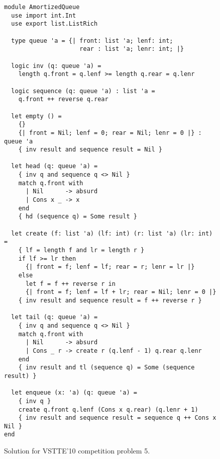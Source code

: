 \begin{figure}
  \centering
\begin{verbatim}
module AmortizedQueue
  use import int.Int
  use export list.ListRich

  type queue 'a = {| front: list 'a; lenf: int;
                     rear : list 'a; lenr: int; |}

  logic inv (q: queue 'a) =
    length q.front = q.lenf >= length q.rear = q.lenr

  logic sequence (q: queue 'a) : list 'a =
    q.front ++ reverse q.rear

  let empty () =
    {}
    {| front = Nil; lenf = 0; rear = Nil; lenr = 0 |} : queue 'a
    { inv result and sequence result = Nil }

  let head (q: queue 'a) =
    { inv q and sequence q <> Nil }
    match q.front with
      | Nil      -> absurd
      | Cons x _ -> x
    end
    { hd (sequence q) = Some result }

  let create (f: list 'a) (lf: int) (r: list 'a) (lr: int) =
    { lf = length f and lr = length r }
    if lf >= lr then
      {| front = f; lenf = lf; rear = r; lenr = lr |}
    else
      let f = f ++ reverse r in
      {| front = f; lenf = lf + lr; rear = Nil; lenr = 0 |}
    { inv result and sequence result = f ++ reverse r }

  let tail (q: queue 'a) =
    { inv q and sequence q <> Nil }
    match q.front with
      | Nil      -> absurd
      | Cons _ r -> create r (q.lenf - 1) q.rear q.lenr
    end
    { inv result and tl (sequence q) = Some (sequence result) }

  let enqueue (x: 'a) (q: queue 'a) =
    { inv q }
    create q.front q.lenf (Cons x q.rear) (q.lenr + 1)
    { inv result and sequence result = sequence q ++ Cons x Nil }
end
\end{verbatim}
\vspace*{-2em}\hrulefill
  \caption{Solution for VSTTE'10 competition problem 5.}
  \label{fig:AQueue}
\end{figure}




